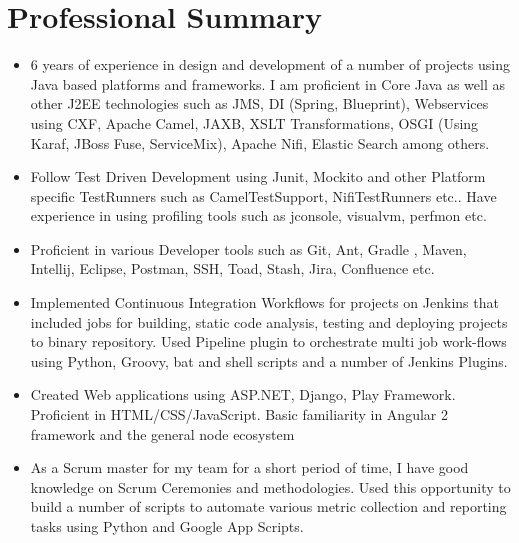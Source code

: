 \documentclass[letterpaper]{twentysecondcv} %
\begin{document}
\section{Professional Summary}

\begin{itemize}[leftmargin=*]

	\item 6 years of experience in design and development of a number of projects using Java based platforms and frameworks. I am proficient in Core Java as well as other J2EE technologies such as JMS, DI (Spring, Blueprint), Webservices using CXF, Apache Camel, JAXB, XSLT Transformations, OSGI (Using Karaf, JBoss Fuse, ServiceMix), Apache Nifi, Elastic Search among others. 

	\item Follow Test Driven Development using Junit, Mockito and other Platform specific TestRunners such as CamelTestSupport, NifiTestRunners etc.. Have experience in using profiling tools such as jconsole, visualvm, perfmon etc.

	\item Proficient in various Developer tools such as Git, Ant, Gradle , Maven, Intellij, Eclipse, Postman, SSH, Toad, Stash, Jira, Confluence etc.

	\item Implemented Continuous Integration Workflows for projects on Jenkins that included jobs for building, static code analysis, testing and deploying projects to binary repository. Used Pipeline plugin to orchestrate multi job work-flows using Python, Groovy, bat and shell scripts and a number of Jenkins Plugins.

	\item Created Web applications using ASP.NET, Django, Play Framework. Proficient in HTML/CSS/JavaScript. Basic familiarity in Angular 2 framework and the general node ecosystem

	\item As a Scrum master for my team for a short period of time, I have good knowledge on Scrum Ceremonies and methodologies. Used this opportunity to build a number of scripts to automate various metric collection and reporting tasks using Python and Google App Scripts.
\end{itemize}
~\\


\end{document}
